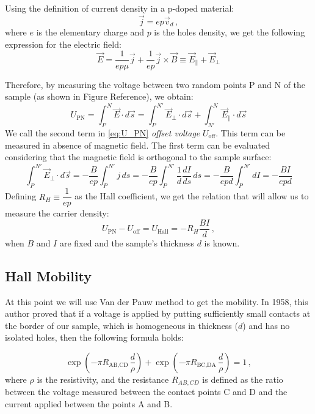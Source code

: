 \documentclass[11pt,a4paper]{article}
\begin{document}
Using the definition of current density in a p-doped material:
\begin{equation*}
\vec{j}=ep\vec{v}_d\,,
\end{equation*}
where $e$ is the elementary charge and $p$ is the holes density, we get the following expression for the electric field:
\begin{equation*}
\vec{E}=\frac{1}{ep\mu}\vec{j}+\frac{1}{ep}\vec{j}\times\vec{B}\equiv \vec{E}_\parallel+\vec{E}_\perp
\end{equation*}

Therefore, by measuring the voltage between two random points P and N of the sample (as shown in Figure {\color{red}Reference}), we obtain:
\begin{equation}\label{eq:U_PN}
U_\text{PN}=\int_P^N\vec{E}\cdot d\vec{s}=\int_P^{N'}\vec{E}_\perp\cdot d\vec{s}+\int_{N'}^N\vec{E}_\parallel\cdot d\vec{s}
\end{equation}
We call the second term in \eqref{eq:U_PN} \emph{offset voltage} $U_\text{off}$. This term can be measured in absence of magnetic field. The first term can be evaluated considering that the magnetic field is orthogonal to the sample surface:
\begin{equation}
\int_P^{N'}\vec{E}_\perp\cdot d\vec{s}=-\frac{B}{ep}\int_P^{N'}j\, ds=-\frac{B}{ep}\int_P^{N'}\frac{1}{d}\frac{dI}{ds}\, ds=-\frac{B}{epd}\int_P^{N'} dI=-\frac{BI}{epd}
\end{equation}
Defining $R_H\equiv\dfrac{1}{ep}$ as the Hall coefficient, we get the relation that will allow us to measure the carrier density:
\begin{equation}\label{eq:Hall_voltage}
U_\text{PN}-U_\text{off}=U_\text{Hall}=-R_H\frac{BI}{d}\,,
\end{equation}
when $B$ and $I$ are fixed and the sample's thickness $d$ is known.




\subsection{Hall Mobility}
At this point we will use Van der Pauw method to get the mobility. In 1958, this author \cite{vdP} proved that if a voltage is applied by putting sufficiently small contacts at the border of our sample, which is homogeneous in thickness ($d$) and has no isolated holes, then the following formula holds:

\begin{equation}
\exp\left(-\pi R_\text{AB,CD}\,\frac{d}{\rho}\right)+\exp\left(-\pi R_\text{BC,DA}\,\frac{d}{\rho}\right)=1\,,
\end{equation}
where $\rho$ is the resistivity, and the resistance $R_{AB,CD}$ is defined as the ratio between the voltage measured between the contact points C and D and the current applied between the points A and B.
\end{document}
